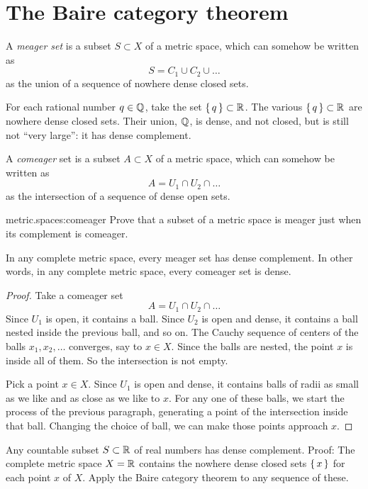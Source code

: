 \section{The Baire category theorem}
A \emph{meager set} is a subset \(S \subset X\) of a metric space, 
which can somehow be written as
\[
S = C_1 \cup C_2 \cup \dots
\]
as the union of a sequence of nowhere dense closed sets.
\begin{example}
For each rational number \(q \in \mathbb{Q}^{}\), take the set \(\set{q} \subset \mathbb{R}^{}\).
The various \(\set{q} \subset \mathbb{R}^{}\) are nowhere dense closed sets.
Their union, \(\mathbb{Q}^{}\), is dense, and not closed, but is still not ``very large'': it has dense complement.
\end{example}
A \emph{comeager} set is a subset \(A \subset X\) of a metric space, which can somehow be written as
\[
A = U_1 \cap U_2 \cap \dots
\]
as the intersection of a sequence of dense open sets.
\begin{problem}{metric.spaces:comeager}
Prove that a subset of a metric space is meager just when its complement is comeager.
\end{problem}
\begin{theorem}\label{theorem:Baire.category}
In any complete metric space, every meager set has dense complement.
In other words, in any complete metric space, every comeager set is dense.
\end{theorem}
\begin{proof}
Take a comeager set
\[
A = U_1 \cap U_2 \cap \dots
\]
Since \(U_1\) is open, it contains a ball.
Since \(U_2\) is open and dense, it contains a ball nested inside the previous ball, and so on.
The Cauchy sequence of centers of the balls \(x_1, x_2, \dots\) converges, say to \(x \in X\).
Since the balls are nested, the point \(x\) is inside all of them.
So the intersection is not empty.

Pick a point \(x \in X\).
Since \(U_1\) is open and dense, it contains balls of radii as small as we like and as close as we like to \(x\).
For any one of these balls, we start the process of the previous paragraph, generating a point of the intersection inside that ball.
Changing the choice of ball, we can make those points approach \(x\).
\end{proof}
\begin{example}
Any countable subset \(S \subset \mathbb{R}^{}\) of real numbers has dense complement.
Proof: The complete metric space \(X=\mathbb{R}^{}\) contains the nowhere dense closed sets \(\set{x}\) for each point \(x\) of \(X\). 
Apply the Baire category theorem to any sequence of these.
\end{example}
